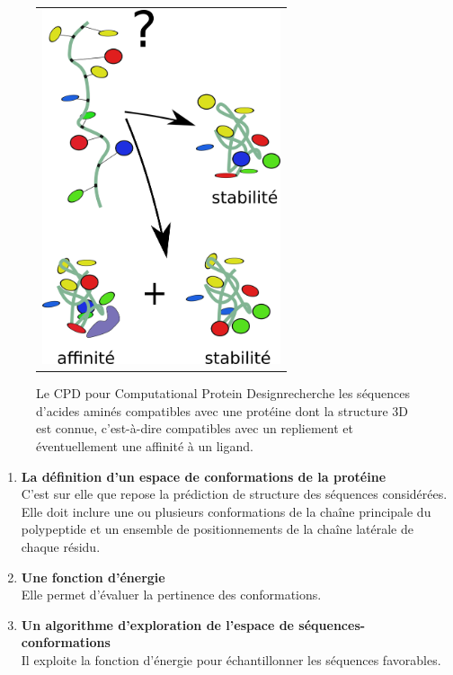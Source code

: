    \begin{figure}[!htbp]
     \centering
     \begin{tabular}{c}
       \includegraphics[width=7cm]{figure/CPD.png} &
     \end{tabular}
     
     \caption{Le CPD pour \og Computational Protein Design\fg recherche les séquences d'acides aminés compatibles avec une protéine dont la structure 3D  est connue, c'est-à-dire compatibles avec un repliement et éventuellement une affinité à un ligand.}
\label{graph:CPD}
   \end{figure}


\begin{enumerate}[leftmargin=*]

\item \textbf{La définition d'un espace de conformations de la protéine}\\
C'est sur elle que repose la prédiction de structure des séquences considérées. Elle doit inclure une ou plusieurs conformations de la chaîne principale du polypeptide et un ensemble de positionnements de la chaîne latérale de chaque résidu.
\item \textbf{Une fonction d'énergie}\\
Elle permet d'évaluer la pertinence des conformations. 
\item \textbf{Un algorithme d'exploration de l'espace de séquences-conformations}\\
Il exploite la fonction d'énergie pour échantillonner les séquences favorables.
\end{enumerate}

